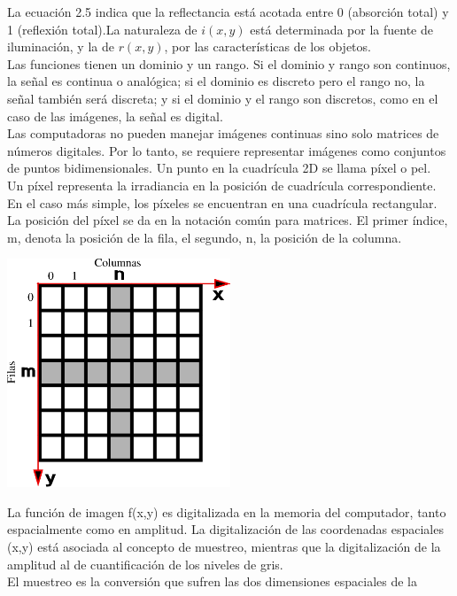 La ecuación 2.5 indica que la reflectancia está acotada entre 0 (absorción total) y
1 (reflexión total).La naturaleza de $i(x,y)$ está determinada por la fuente de iluminación, y la de $r(x,y)$, por
las características de los objetos.\\
Las funciones tienen un
dominio y un rango. Si el dominio y rango son continuos, la señal es continua o
analógica; si el dominio es discreto pero el rango no, la señal también será discreta; y si
el dominio y el rango son discretos, como en el caso de las imágenes, la señal es digital.\\
Las computadoras no pueden manejar imágenes continuas sino solo matrices de números digitales. Por lo tanto, se 
requiere representar imágenes como conjuntos de puntos bidimensionales. Un punto en la cuadrícula 2D se llama píxel o pel.\\
Un píxel representa la irradiancia en la posición de cuadrícula correspondiente. En el caso más simple, los píxeles se encuentran 
en una cuadrícula rectangular. La posición del píxel se da en la notación común para matrices.
El primer índice, m, denota la posición de la fila, el segundo, n, la posición de la columna.
\begin{center}
    \includegraphics[width=0.5\textwidth]{Capitulo2/Fig8.eps}
    \label{Fig8}
\end{center}
La función de imagen f(x,y) es digitalizada en la memoria del computador, tanto
espacialmente como en amplitud. La digitalización de las coordenadas espaciales (x,y)
está asociada al concepto de muestreo, mientras que la digitalización de la amplitud al
de cuantificación de los niveles de gris.\cite{joseramon2005}
\\El muestreo es la conversión que sufren las dos dimensiones espaciales de la
